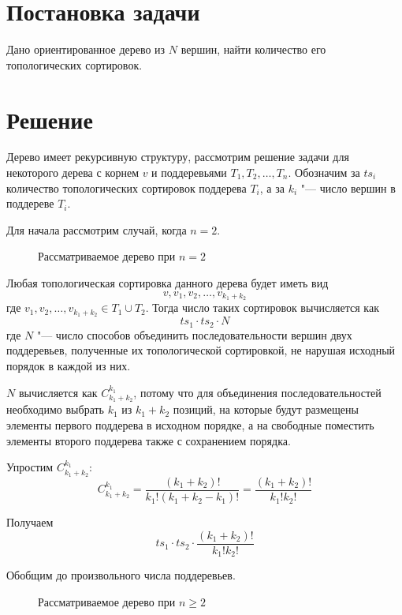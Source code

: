 \documentclass[a4paper,12pt]{article}
\begin{document}
\theoremstyle{plain}
\newtheorem*{theorem}{Теорема}

\section*{Постановка задачи}
Дано ориентированное дерево из $N$ вершин, найти количество его топологических сортировок.

\section*{Решение}
Дерево имеет рекурсивную структуру, рассмотрим решение задачи для некоторого дерева с корнем $v$ и поддеревьями $T_1, T_2, \dots, T_n$. Обозначим за $ts_i$ количество топологических сортировок поддерева $T_i$, а за $k_i$ "--- число вершин в поддереве $T_i$.

Для начала рассмотрим случай, когда $n=2$.

\begin{figure}[!htb]
\centering
{}
\caption{Рассматриваемое дерево при $n=2$}
\end{figure}

Любая топологическая сортировка данного дерева будет иметь вид
\[ v, v_1, v_2, \dots, v_{k_1 + k_2} \]
где $v_1, v_2, \dots, v_{k_1 + k_2} \in T_1 \cup T_2$. Тогда число таких сортировок вычисляется как
\[ ts_1 \cdot ts_2 \cdot N \]
где $N$ "--- число способов объединить последовательности вершин двух поддеревьев, полученные их топологической сортировкой, не нарушая исходный порядок в каждой из них.

$N$ вычисляется как $C_{k_1 + k_2}^{k_1}$, потому что для объединения последовательностей необходимо выбрать $k_1$ из $k_1 + k_2$ позиций, на которые будут размещены элементы первого поддерева в исходном порядке, а на свободные поместить элементы второго поддерева также с сохранением порядка.

Упростим $C_{k_1 + k_2}^{k_1}$:
\[
C_{k_1 + k_2}^{k_1}
  = \frac{(k_1 + k_2)!}{k_1!(k_1 + k_2 - k_1)!}
  = \frac{(k_1 + k_2)!}{k_1!k_2!}
\]

Получаем
\[ ts_1 \cdot ts_2 \cdot \frac{(k_1 + k_2)!}{k_1!k_2!} \]

Обобщим до произвольного числа поддеревьев.

\begin{figure}[!htb]
\centering
{}
\caption{Рассматриваемое дерево при $n \geqslant 2$}
\end{figure}
\end{document}

